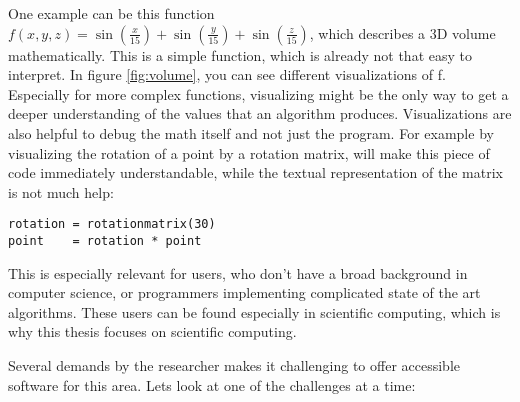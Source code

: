 
One example can be this function $f(x,y,z)=\sin(\frac{x}{15})+\sin(\frac{y}{15})+\sin(\frac{z}{15})$, which describes a 3D volume mathematically. 
This is a simple function, which is already not that easy to interpret. In figure \ref{fig:volume}, you can see different visualizations of f. Especially for more complex functions, visualizing might be the only way to get a deeper understanding of the values that an algorithm produces.
Visualizations are also helpful to debug the math itself and not just the program. For example by visualizing the rotation of a point by a rotation matrix, will make this piece of code immediately understandable, while the textual representation of the matrix is not much help:
\begin{minipage}{\linewidth}
    \centering
\begin{lstlisting}
rotation = rotationmatrix(30)
point    = rotation * point
\end{lstlisting}
\end{minipage}
This is especially relevant for users, who don't have a broad background in computer science, or programmers implementing complicated state of the art algorithms.
These users can be found especially in scientific computing, which is why this thesis focuses on scientific computing. 





Several demands by the researcher makes it challenging to offer accessible software for this area.
Lets look at one of the challenges at a time:

